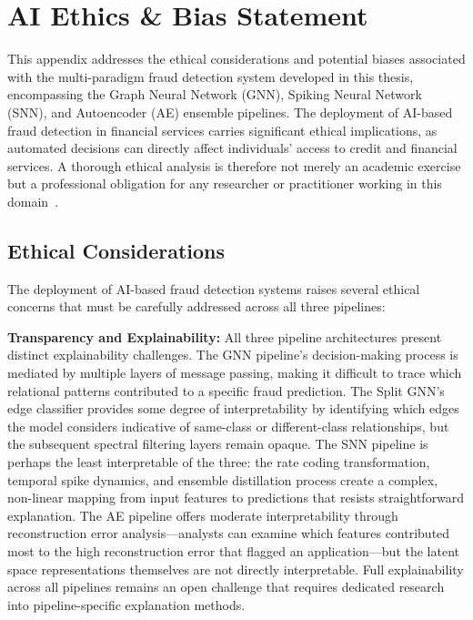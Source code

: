 \chapter{AI Ethics \& Bias Statement}
\label{app:ethics}

This appendix addresses the ethical considerations and potential biases associated with the multi-paradigm fraud detection system developed in this thesis, encompassing the Graph Neural Network (GNN), Spiking Neural Network (SNN), and Autoencoder (AE) ensemble pipelines. The deployment of AI-based fraud detection in financial services carries significant ethical implications, as automated decisions can directly affect individuals' access to credit and financial services. A thorough ethical analysis is therefore not merely an academic exercise but a professional obligation for any researcher or practitioner working in this domain~\cite{chouldechova2017fair}.

\section{Ethical Considerations}

The deployment of AI-based fraud detection systems raises several ethical concerns that must be carefully addressed across all three pipelines:

\textbf{Transparency and Explainability:} All three pipeline architectures present distinct explainability challenges. The GNN pipeline's decision-making process is mediated by multiple layers of message passing, making it difficult to trace which relational patterns contributed to a specific fraud prediction. The Split GNN's edge classifier provides some degree of interpretability by identifying which edges the model considers indicative of same-class or different-class relationships, but the subsequent spectral filtering layers remain opaque. The SNN pipeline is perhaps the least interpretable of the three: the rate coding transformation, temporal spike dynamics, and ensemble distillation process create a complex, non-linear mapping from input features to predictions that resists straightforward explanation. The AE pipeline offers moderate interpretability through reconstruction error analysis---analysts can examine which features contributed most to the high reconstruction error that flagged an application---but the latent space representations themselves are not directly interpretable. Full explainability across all pipelines remains an open challenge that requires dedicated research into pipeline-specific explanation methods.

